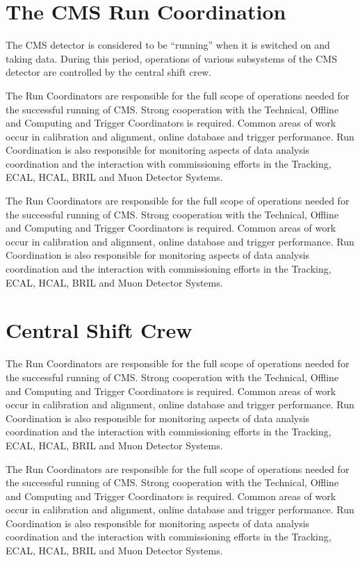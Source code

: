 \section{The CMS Run Coordination}
\label{sec:RC}

The \ac{CMS} detector is considered to be ``running'' when it is switched on and taking data. During this period, operations of various subsystems of the \ac{CMS} detector are controlled by the central shift crew. 

The Run Coordinators are responsible for the full scope of operations needed for the successful running of CMS. Strong cooperation with the Technical, Offline and Computing and Trigger Coordinators is required. Common areas of work occur in calibration and alignment, online database and trigger performance. Run Coordination is also responsible for monitoring aspects of data analysis coordination and the interaction with commissioning efforts in the Tracking, ECAL, HCAL, BRIL and Muon Detector Systems.

The Run Coordinators are responsible for the full scope of operations needed for the successful running of CMS. Strong cooperation with the Technical, Offline and Computing and Trigger Coordinators is required. Common areas of work occur in calibration and alignment, online database and trigger performance. Run Coordination is also responsible for monitoring aspects of data analysis coordination and the interaction with commissioning efforts in the Tracking, ECAL, HCAL, BRIL and Muon Detector Systems.

\section{Central Shift Crew}
\label{sec:ControlRoom}

The Run Coordinators are responsible for the full scope of operations needed for the successful running of CMS. Strong cooperation with the Technical, Offline and Computing and Trigger Coordinators is required. Common areas of work occur in calibration and alignment, online database and trigger performance. Run Coordination is also responsible for monitoring aspects of data analysis coordination and the interaction with commissioning efforts in the Tracking, ECAL, HCAL, BRIL and Muon Detector Systems.

The Run Coordinators are responsible for the full scope of operations needed for the successful running of CMS. Strong cooperation with the Technical, Offline and Computing and Trigger Coordinators is required. Common areas of work occur in calibration and alignment, online database and trigger performance. Run Coordination is also responsible for monitoring aspects of data analysis coordination and the interaction with commissioning efforts in the Tracking, ECAL, HCAL, BRIL and Muon Detector Systems.

